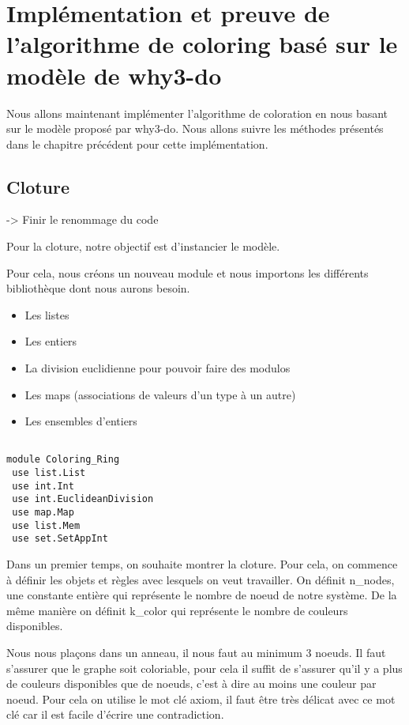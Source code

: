 \documentclass[11pt]{article}
\begin{document}
\section{Implémentation et preuve de l’algorithme de coloring basé sur le modèle de why3-do}
\label{sec:org963800a}

Nous allons maintenant implémenter l'algorithme de coloration en nous basant sur le modèle proposé par why3-do.
Nous allons suivre les méthodes présentés dans le chapitre précédent pour cette implémentation.

\subsection{Cloture}
\label{sec:org04acca6}
-> Finir le renommage du code

Pour la cloture, notre objectif est d'instancier le modèle. 

Pour cela, nous créons un nouveau module et nous importons les différents bibliothèque dont nous aurons besoin. 
\begin{itemize}
\item Les listes
\item Les entiers
\item La division euclidienne pour pouvoir faire des modulos
\item Les maps (associations de valeurs d'un type à un autre)
\item Les ensembles d'entiers
\end{itemize}

\lstset{language=why3,label= ,caption= ,captionpos=b,numbers=none}
\begin{lstlisting}

module Coloring_Ring
 use list.List
 use int.Int
 use int.EuclideanDivision
 use map.Map
 use list.Mem
 use set.SetAppInt

\end{lstlisting}

Dans un premier temps, on souhaite montrer la cloture.
Pour cela, on commence à définir les objets et règles avec lesquels on veut travailler. 
On définit n\_nodes, une constante entière qui représente le nombre de noeud de notre système. 
De la même manière on définit k\_color qui représente le nombre de couleurs disponibles.

Nous nous plaçons dans un anneau, il nous faut au minimum 3 noeuds. 
Il faut s'assurer que le graphe soit coloriable, pour cela il suffit de s'assurer qu'il y a plus de couleurs disponibles que de noeuds, c'est à dire au moins une couleur par noeud. 
Pour cela on utilise le mot clé axiom, il faut être très délicat avec ce mot clé car il est facile d'écrire une contradiction. 
\end{document}
